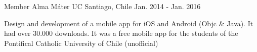 

\begin{cventries}

  \cventry
    {Member}
    {Alma Máter UC}
    {Santiago, Chile}
    {Jan. 2014 - Jan. 2016}
    {
      \begin{cvitems}
        \item {Design and development of a mobile app for iOS and Android (Objc \& Java). It had over 30.000 downloads. It was a free mobile app for the students of the Pontifical Catholic University of Chile (unofficial)}
      \end{cvitems}
    }

\end{cventries}
